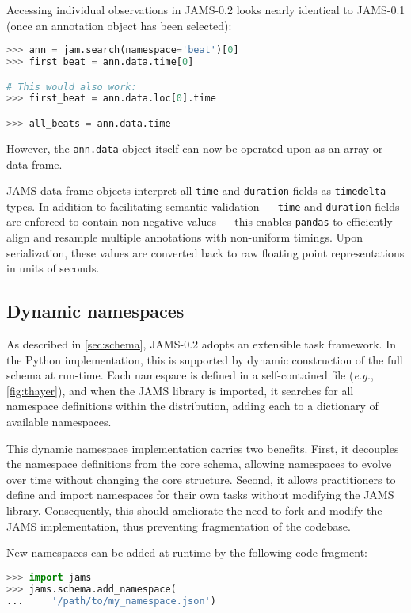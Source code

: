 \documentclass{article}
\begin{document}
Accessing individual observations in JAMS-0.2 looks nearly identical to JAMS-0.1
(once an annotation object has been selected):
\begin{lstlisting}[language=python]
>>> ann = jam.search(namespace='beat')[0]
>>> first_beat = ann.data.time[0]

# This would also work:
>>> first_beat = ann.data.loc[0].time

>>> all_beats = ann.data.time
\end{lstlisting}
However, the \texttt{ann.data} object itself can now be operated upon as an array or
data frame.

JAMS data frame objects interpret all \texttt{time} and \texttt{duration} fields as
\texttt{timedelta} types.  In addition to facilitating semantic validation ---
\texttt{time} and \texttt{duration} fields are enforced to contain non-negative values --- 
this enables \texttt{pandas} to efficiently align and resample multiple annotations with 
non-uniform timings.  Upon serialization, these values are converted back to raw floating
point representations in units of seconds.


\subsection{Dynamic namespaces}\label{sec:imp:namespaces}
As described in \cref{sec:schema}, JAMS-0.2 adopts an extensible task framework.
In the Python implementation, this is supported by dynamic construction of the full
schema at run-time.
Each namespace is defined in a self-contained file (\emph{e.g.}, \cref{fig:thayer}), and
when the JAMS library is imported, it searches for all namespace definitions within the
distribution, adding each to a dictionary of available namespaces.

This dynamic namespace implementation carries two benefits.  First, it decouples the
namespace definitions from the core schema, allowing namespaces to evolve over
time without changing the core structure.  Second, it allows practitioners to define and
import namespaces for their own tasks without modifying the JAMS library.  Consequently,
this should ameliorate the need to fork and modify the JAMS implementation, thus
preventing fragmentation of the codebase.

New namespaces can be added at runtime by the following code fragment:
\begin{lstlisting}[language=python]
>>> import jams
>>> jams.schema.add_namespace(
...     '/path/to/my_namespace.json')
\end{lstlisting}
\end{document}

